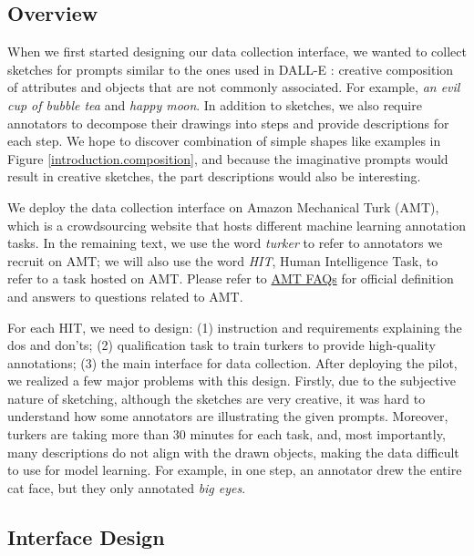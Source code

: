 \subsection{Overview}
When we first started designing our data collection interface, we wanted to collect sketches for prompts similar to the ones used in DALL-E \citep{dallePaper}: creative composition of attributes and objects that are not commonly associated. 
For example, \textit{an evil cup of bubble tea} and \textit{happy moon}. 
In addition to sketches, we also require annotators to decompose their drawings into steps and provide descriptions for each step. We hope to discover combination of simple shapes like examples in Figure \ref{introduction.composition}, and because the imaginative prompts would result in creative sketches, the part descriptions would also be interesting.     

We deploy the data collection interface on Amazon Mechanical Turk (AMT), which is a crowdsourcing website that hosts different machine learning annotation tasks. In the remaining text, we use the word \textit{turker} to refer to annotators we recruit on AMT; we will also use the word \textit{HIT}, Human Intelligence Task, to refer to a task hosted on AMT. Please refer to \href{https://www.mturk.com/worker/help#:~:text=A%20Human%20Intelligence%20Task%2C%20or,be%20completed%20by%20Worker%20customers.}{AMT FAQs} for official definition and answers to questions related to AMT. 
 
For each HIT, we need to design: (1) instruction and requirements explaining the dos and don'ts; (2) qualification task to train turkers to provide high-quality annotations; (3) the main interface for data collection. 
After deploying the pilot, we realized a few major problems with this design. Firstly, due to the subjective nature of sketching, although the sketches are very creative, it was hard to understand how some annotators are illustrating the given prompts. Moreover, turkers are taking more than 30 minutes for each task, and, most importantly, many descriptions do not align with the drawn objects, making the data difficult to use for model learning. For example, in one step, an annotator drew the entire cat face, but they only annotated \textit{big eyes}.      

\subsection{Interface Design}

